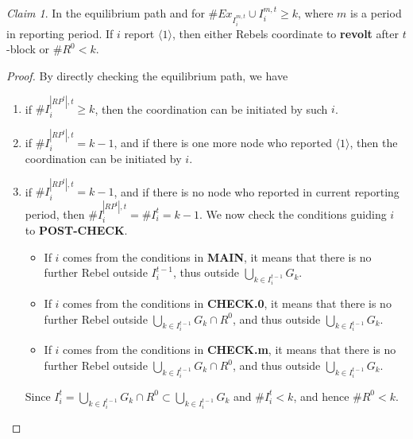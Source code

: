 \documentclass[12pt,letterpaper]{article}
\theoremstyle{definition}
\theoremstyle{remark}
\theoremstyle{claim}
\newtheorem{claim}{Claim}
\begin{document}
\begin{claim}
\label{claim_either_success_or_fail}
In the equilibrium path and for $\#Ex_{I^{m,t}_i}\cup I^{m,t}_i\geq k$, where $m$ is a period in reporting period. If $i$ report $\langle 1 \rangle$, then either Rebels coordinate to \textbf{revolt} after $t$-block or $\# R^0<k$.
\end{claim}
\begin{proof}
By directly checking the equilibrium path, we have
\begin{enumerate}
\item if $\# I^{|RP^t|,t}_i\geq k$, then the coordination can be initiated by such $i$.
\item if $\# I^{|RP^t|,t}_i= k-1$, and if there is one more node who reported $\langle 1 \rangle$, then the coordination can be initiated by $i$.
\item if $\# I^{|RP^t|,t}_i= k-1$, and if there is no node who reported in current reporting period, then $\# I^{|RP^t|,t}_i=\# I^{t}_i= k-1$. We now check the conditions guiding $i$ to \textbf{POST-CHECK}.
\begin{itemize}
\item If $i$ comes from the conditions in \textbf{MAIN}, it means that there is no further Rebel outside $I^{t-1}_i$, thus outside $\bigcup_{k\in I^{t-1}_i}G_k$.
\item If $i$ comes from the conditions in \textbf{CHECK.0}, it means that there is no further Rebel outside $\bigcup_{k\in I^{t-1}_i}G_k\cap R^0$, and thus outside $\bigcup_{k\in I^{t-1}_i}G_k$. 
\item If $i$ comes from the conditions in \textbf{CHECK.m}, it means that there is no further Rebel outside $\bigcup_{k\in I^{t-1}_i}G_k\cap R^0$, and thus outside $\bigcup_{k\in I^{t-1}_i}G_k$. 
\end{itemize}
Since $I^t_i=\bigcup_{k\in I^{t-1}_i}G_k\cap R^0 \subset \bigcup_{k\in I^{t-1}_i}G_k$ and $\#I^t_i<k$, and hence $\# R^0<k$.

\end{enumerate}


\end{proof}
\end{document}
